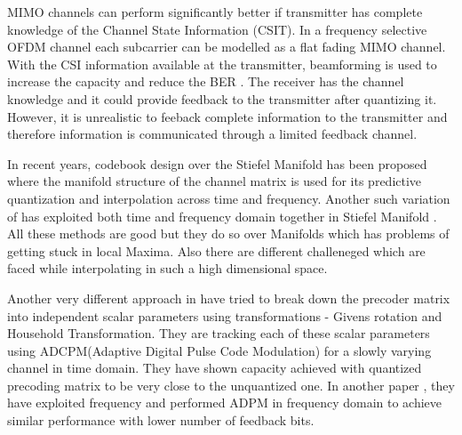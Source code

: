 \documentclass[conference]{IEEEtran}
\begin{document}
MIMO channels can perform significantly better if transmitter has complete knowledge of the Channel State Information (CSIT). In a frequency selective OFDM channel each subcarrier can be modelled as a flat fading MIMO channel. With the CSI information available at the transmitter, beamforming is used to increase the capacity and reduce the BER \cite{love2008overview}. The receiver has the channel knowledge and it could provide feedback to the transmitter after quantizing it. However, it is unrealistic to feeback complete information to the transmitter and therefore information is communicated through a limited feedback channel.

In recent years, codebook design over the Stiefel Manifold \cite{6891198} has been proposed where the manifold structure of the channel matrix is used for its predictive quantization and interpolation across time and frequency. Another such variation of \cite{6891198} has exploited both time and frequency domain together in Stiefel Manifold \cite{Gupt1905:Predictive}. All these methods are good but they do so over Manifolds which has problems of getting stuck in local Maxima. Also there are different challeneged which are faced while interpolating in such a high dimensional space.

Another very different approach in \cite{4114278} have tried to break down the precoder matrix into independent scalar parameters using transformations - Givens rotation and Household Transformation. They are tracking each of these scalar parameters using ADCPM(Adaptive Digital Pulse Code Modulation) for a slowly varying channel in time domain. They have shown capacity achieved with quantized precoding matrix to be very close to the unquantized one. In another paper \cite{4556174}, they have exploited frequency and performed ADPM in frequency domain to achieve similar performance with lower number of feedback bits.  
\end{document}
